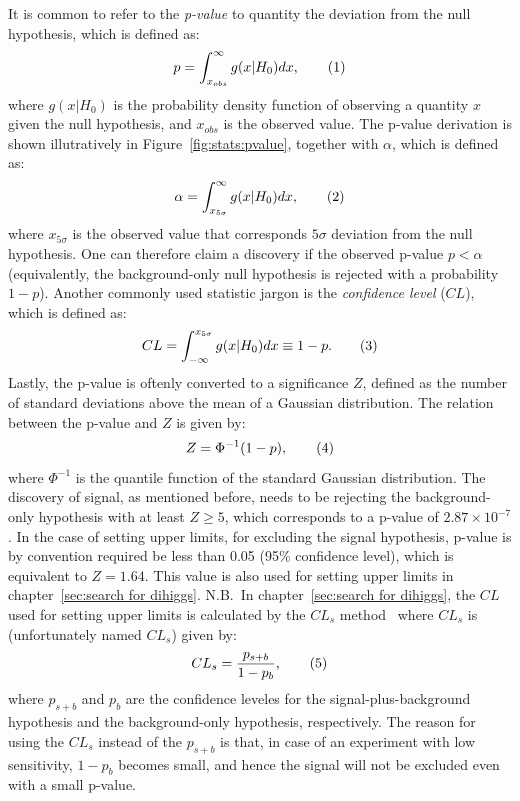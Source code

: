 It is common to refer to the \textit{p-value} to quantity the deviation from the null hypothesis, 
which is defined as:
\[
p = \int_{x_{obs}}^\infty g(x|H_0) dx,
\addtag \]
where $g(x|H_0)$ is the probability density function of observing a quantity
$x$ given the null hypothesis, and $x_{obs}$ is the observed value. The p-value derivation 
is shown illutratively in Figure~\ref{fig:stats:pvalue}, together with $\alpha$, 
which is defined as:
\[
\alpha = \int_{x_{5\sigma}}^\infty g(x|H_0) dx,  
\addtag \]
where $x_{5\sigma}$ is the observed value that corresponds $5\sigma$ deviation 
from the null hypothesis. 
One can therefore claim a discovery if the observed p-value $p < \alpha$ (equivalently, 
the background-only null hypothesis is rejected with a probability $1-p$).
Another commonly used statistic jargon is the \textit{confidence level} ($CL$),
which is defined as:
\[
CL   = \int_{ -\infty}^{x_{5\sigma}} g(x|H_0) dx \equiv 1- p .
\addtag \]
Lastly, the p-value is oftenly converted to a significance $Z$, 
defined as the number of standard deviations above the mean of a Gaussian distribution.
The relation between the p-value and $Z$ is given by:
\[
Z=\Phi^{-1} (1-p),
\addtag \]
where $\Phi^{-1}$ is the quantile function of the standard Gaussian distribution.
The discovery of signal, as mentioned before, needs to be rejecting the background-only hypothesis
with at least $Z \ge 5$, which corresponds to a p-value of $2.87 \times 10^{-7}$.
In the case of setting upper limits, for excluding the signal hypothesis, p-value is by convention 
required be less than 0.05 (95\% confidence level), which is equivalent to $Z = 1.64$.
This value is also used for setting upper limits in chapter~\ref{sec:search for dihiggs}.
N.B.\ In chapter~\ref{sec:search for dihiggs}, 
the $CL$ used for setting upper limits is calculated by the $CL_s$ method~\cite{CLs}
where $CL_s$ is (unfortunately named $CL_s$) given by:
\[
    CL_s   =  \frac{p_{s+b}}{1-p_b},
\addtag \]
where $p_{s+b}$ and $p_b$ are the confidence leveles for the signal-plus-background hypothesis
and the background-only hypothesis, respectively. 
The reason for using the $CL_s$ instead of the $p_{s+b}$ is that, in case of an experiment 
with low sensitivity, $1-p_b$ becomes small, and hence the signal will not 
be excluded even with a small p-value. 

